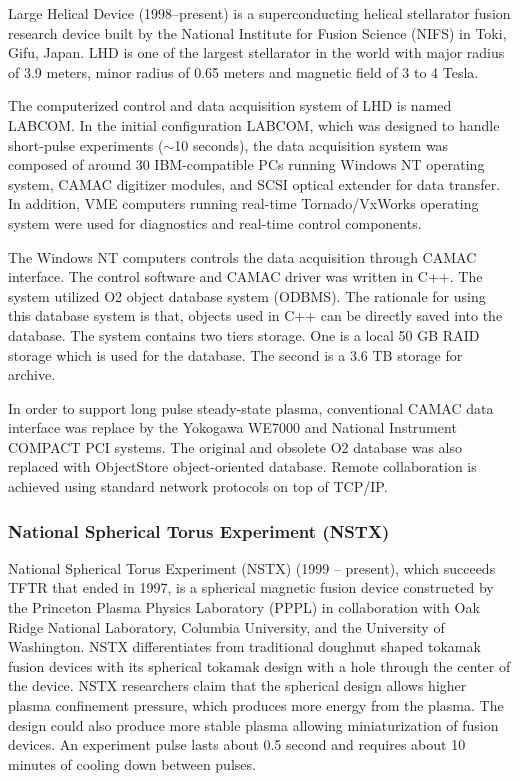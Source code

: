 Large Helical Device\cite{iiyoshi1990design, iiyoshi1999overview} (1998--present) is a superconducting helical stellarator fusion research device built by the National Institute for Fusion Science (NIFS) in Toki, Gifu, Japan. LHD is one of the largest stellarator in the world with major radius of 3.9 meters, minor radius of 0.65 meters and magnetic field of 3 to 4 Tesla\cite{iiyoshi1999overview}.

The computerized control and data acquisition system of LHD is named LABCOM. In the initial configuration LABCOM\cite{nakanishi2000object}, which was designed to handle short-pulse experiments ($\sim$10 seconds), the data acquisition system was composed of around 30 IBM-compatible PCs running Windows NT operating system, CAMAC digitizer modules, and SCSI optical extender for data transfer. In addition, VME computers running real-time Tornado/VxWorks operating system were used for diagnostics and real-time control components.

The Windows NT computers controls the data acquisition through CAMAC interface. The control software and CAMAC driver was written in C++. The system utilized O2 object database system (ODBMS). The rationale for using this database system is that, objects used in C++ can be directly saved into the database. The system contains two tiers storage. One is a local 50 GB RAID storage which is used for the database. The second is a 3.6 TB storage for archive.

In order to support long pulse steady-state plasma, conventional CAMAC data interface was replace by the Yokogawa WE7000 and National Instrument COMPACT PCI systems. The original and obsolete O2 database was also replaced with ObjectStore object-oriented database\cite{hideya2003steady,sudo2006control,nagayama2008control}. Remote collaboration is achieved using standard network protocols on top of TCP/IP.


\subsubsection{National Spherical Torus Experiment (NSTX)}

National Spherical Torus Experiment (NSTX)\cite{ono2000exploration} (1999 -- present), which succeeds TFTR that ended in 1997, is a spherical magnetic fusion device constructed by the Princeton Plasma Physics Laboratory (PPPL) in collaboration with Oak Ridge National Laboratory, Columbia University, and the University of Washington. NSTX differentiates from traditional doughnut shaped tokamak fusion devices with its spherical tokamak design with a hole through the center of the device. NSTX researchers claim that the spherical design allows higher plasma confinement pressure, which produces more energy from the plasma. The design could also produce more stable plasma allowing miniaturization of fusion devices. An experiment pulse lasts about 0.5 second and requires about 10 minutes of cooling down between pulses\cite{sichta2001overview}.

